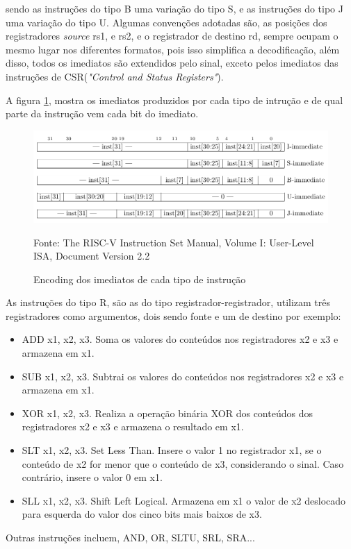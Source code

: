 		sendo as instruções do tipo B uma variação do tipo S, e as instruções do tipo J uma variação do tipo U. Algumas convenções adotadas são, as posições dos registradores \textit{source} rs1, e rs2, e o registrador de destino rd, sempre ocupam o mesmo lugar nos diferentes formatos, pois isso simplifica a decodificação, além disso, todos os imediatos são extendidos pelo sinal, exceto pelos imediatos das instruções de CSR(\textit{"Control and Status Registers"}). 

		A figura \ref{fig:immediate_encoding}, mostra os imediatos produzidos por cada tipo de intrução e de qual parte da instrução vem cada bit do imediato.

		\begin{figure}[h]
		  \includegraphics[width=\linewidth]{img/immediate_encoding.png}
		  \caption{Encoding dos imediatos de cada tipo de instrução}
		  Fonte: The RISC-V Instruction Set Manual, Volume I: User-Level ISA, Document Version 2.2~\cite{riscv_spec}
		  \label{fig:immediate_encoding}
		\end{figure}

		As instruções do tipo R, são as do tipo registrador-registrador, utilizam três registradores como argumentos, dois sendo fonte e um de destino por exemplo:
		\begin{itemize}
			\item{ADD x1, x2, x3. Soma os valores do conteúdos nos registradores x2 e x3 e armazena em x1.}
			\item{SUB x1, x2, x3. Subtrai os valores do conteúdos nos registradores x2 e x3 e armazena em x1.}
			\item{XOR x1, x2, x3. Realiza a operação binária XOR dos conteúdos dos registradores x2 e x3 e armazena o resultado em x1.}
			\item{SLT x1, x2, x3. Set Less Than. Insere o valor 1 no registrador x1, se o conteúdo de x2 for menor que o conteúdo de x3, considerando o sinal. Caso contrário, insere o valor 0 em x1.}
			\item{SLL x1, x2, x3. Shift Left Logical. Armazena em x1 o valor de x2 deslocado para esquerda do valor dos cinco bits mais baixos de x3.}				
		\end{itemize}
		Outras instruções incluem, AND, OR, SLTU, SRL, SRA...

